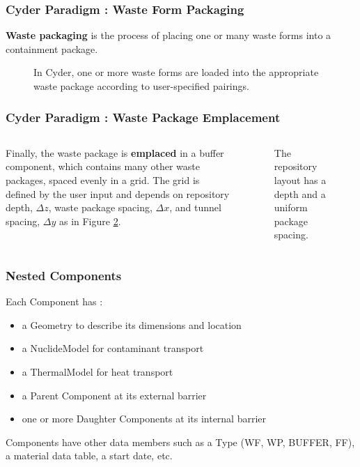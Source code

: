 \begin{frame}[ctb!]
  \frametitle{Cyder Paradigm : Waste Form Packaging}
  \footnotesize{

    \textbf{Waste packaging} is the process of placing one or many waste forms into a 
containment package. 

\begin{figure}[htbp!]
\begin{center}
\def\svgwidth{.5\textwidth}

\end{center}
\caption{In Cyder, one or more waste forms are loaded into the appropriate 
waste package according to user-specified pairings.}
\label{fig:wf_packaging}
\end{figure}
}
\end{frame}

\begin{frame}[ctb!]
  \frametitle{Cyder Paradigm : Waste Package Emplacement}
\footnotesize{
  \begin{columns}[c]
Finally, the waste package is \textbf{emplaced} in a buffer component, which 
contains many other waste packages, spaced evenly in a grid. The grid is 
defined by the user input and depends on repository depth, $\Delta z$, waste 
package spacing, $\Delta x$, and tunnel spacing, $\Delta y$ as in Figure 
\ref{fig:repo_layout}.

\begin{figure}[htbp!]
\begin{center}
\def\svgwidth{.5\textwidth}

\end{center}
\caption{The repository layout has a depth and a uniform package spacing.}
\label{fig:repo_layout}
\end{figure}
\end{columns}
  }
\end{frame}


\begin{frame}
  \frametitle{Nested Components}
  Each Component has : 
  \begin{itemize}
    \item a Geometry to describe its dimensions and location
    \item a NuclideModel for contaminant transport 
    \item a ThermalModel for heat transport
    \item a Parent Component at its external barrier
    \item one or more Daughter Components at its internal barrier
  \end{itemize}

  Components have other data members such as a Type (WF, WP, BUFFER, FF), a 
  material data table, a start date, etc. 
\end{frame}
